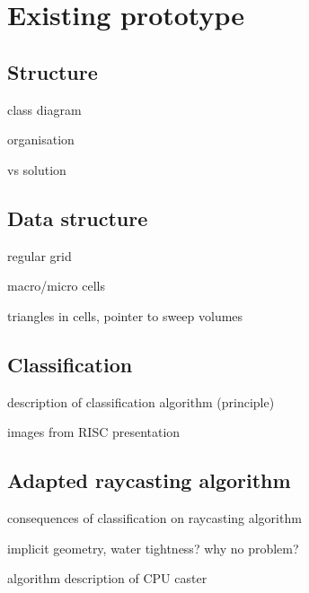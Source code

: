 \section{Existing prototype}


\subsection{Structure}
class diagram

organisation

vs solution


\subsection{Data structure}

regular grid

macro/micro cells

triangles in cells, pointer to sweep volumes


\subsection{Classification}

description of classification algorithm (principle)

images from RISC presentation

\subsection{Adapted raycasting algorithm}

consequences of classification on raycasting algorithm

implicit geometry, water tightness? why no problem?

algorithm description of CPU caster
